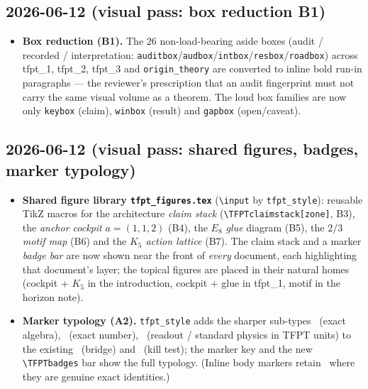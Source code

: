 \subsection*{2026-06-12 (visual pass: box reduction B1)}
\begin{itemize}
\item \textbf{Box reduction (B1).} The $26$ non-load-bearing aside boxes (audit / recorded /
  interpretation: \texttt{auditbox}/\texttt{audbox}/\texttt{intbox}/\texttt{resbox}/\texttt{roadbox})
  across tfpt\_1, tfpt\_2, tfpt\_3 and \texttt{origin\_theory} are converted to inline bold run-in
  paragraphs --- the reviewer's prescription that an audit fingerprint must not carry the same visual
  volume as a theorem. The loud box families are now only \texttt{keybox} (claim), \texttt{winbox}
  (result) and \texttt{gapbox} (open/caveat).
\end{itemize}

\subsection*{2026-06-12 (visual pass: shared figures, badges, marker typology)}
\begin{itemize}
\item \textbf{Shared figure library \texttt{tfpt\_figures.tex}} (\texttt{\textbackslash input} by
  \texttt{tfpt\_style}): reusable TikZ macros for the architecture \emph{claim stack}
  (\texttt{\textbackslash TFPTclaimstack[zone]}, B3), the \emph{anchor cockpit} $a=(1,1,2)$ (B4), the
  \emph{$E_8$ glue} diagram (B5), the \emph{$2/3$ motif map} (B6) and the \emph{$K_5$ action lattice}
  (B7). The claim stack and a marker \emph{badge bar} are now shown near the front of \emph{every}
  document, each highlighting that document's layer; the topical figures are placed in their natural
  homes (cockpit + $K_5$ in the introduction, cockpit + glue in tfpt\_1, motif in the horizon note).
\item \textbf{Marker typology (A2).} \texttt{tfpt\_style} adds the sharper sub-types
  \mE\ (exact algebra), \mE\ (exact number), \mC\ (readout / standard physics in TFPT units) to the
  existing \mC\ (bridge) and \mX\ (kill test); the marker key and the new \texttt{\textbackslash TFPTbadges}
  bar show the full typology. (Inline body markers retain \mE\ where they are genuine exact identities.)
\end{itemize}

